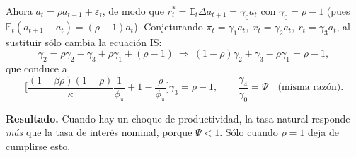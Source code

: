 \documentclass[11pt]{article}
\newenvironment{clave}[1][Idea clave]%
  {\par\medskip\noindent\textbf{#1.}\enspace\ignorespaces}%
  {\par\medskip}
\theoremstyle{definition}
\newcommand{\E}{\mathbb{E}}
\begin{document}
Ahora $a_{t}=\rho a_{t-1}+\varepsilon_{t}$, de modo que
$r_{t}^{\ast}=\E_{t}\Delta a_{t+1}=\gamma_{0}a_{t}$ con
$\gamma_{0}=\rho-1$ (pues $\E_{t}(a_{t+1}-a_{t})=(\rho-1)a_{t}$). Conjeturando
$\pi_{t}=\gamma_{1}a_{t},\ x_{t}=\gamma_{2}a_{t},\ r_{t}=\gamma_{3}a_{t}$, al sustituir sólo cambia la
ecuación IS:
\begin{equation}
\gamma_{2}=\rho\gamma_{2}-\gamma_{3}+\rho\gamma_{1}+(\rho-1)
\ \Longrightarrow\
(1-\rho)\gamma_{2}+\gamma_{3}-\rho\gamma_{1}=\rho-1,
\end{equation}
que conduce a
\begin{equation}
\Big[\frac{(1-\beta\rho)(1-\rho)}{\kappa}\frac{1}{\phi_{\pi}}+1-\frac{\rho}{\phi_{\pi}}\Big]\gamma_{3}=\rho-1,
\qquad
\frac{\gamma_{4}}{\gamma_{0}}=\Psi\quad\text{(misma razón).}
\end{equation}

\begin{clave}[Resultado]
Cuando hay un choque de productividad, la tasa natural responde \emph{más} que la tasa de interés
nominal, porque $\Psi<1$. Sólo cuando $\rho=1$ deja de cumplirse esto.
\end{clave}
\end{document}
